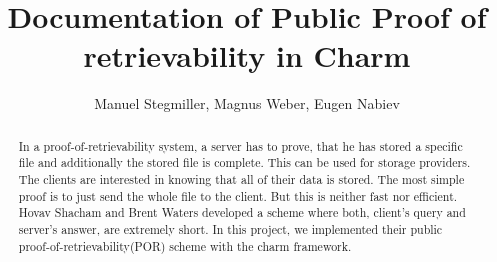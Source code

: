 \documentclass{amsart}
\title{Documentation of Public Proof of retrievability in Charm}
\author{Manuel Stegmiller, Magnus Weber, Eugen Nabiev}
\begin{document}
\begin{abstract}
In a proof-of-retrievability system, a server has to prove, that he has stored a specific file and additionally the stored file is complete. This can be used for storage providers. The clients are interested in knowing that all of their data is stored. The most simple proof is to just send the whole file to the client. But this is neither fast nor efficient. Hovav Shacham and Brent Waters developed a scheme where both, client's query and server's answer, are extremely short. In this project, we implemented their public proof-of-retrievability(POR) scheme with the charm framework.
\end{abstract}
\maketitle
\end{document}
